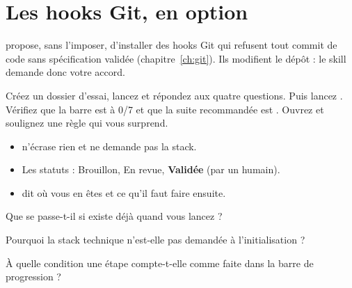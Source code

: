 \section{Les hooks Git, en option}
 propose, sans l'imposer, d'installer des hooks Git qui refusent tout commit de code
sans spécification validée (chapitre~\ref{ch:git}). Ils modifient le dépôt : le skill demande donc votre accord.

\begin{vousjouez}
Créez un dossier d'essai, lancez  et répondez aux quatre questions. Puis lancez
. Vérifiez que la barre est à 0/7 et que la suite recommandée est
. Ouvrez  et soulignez une règle qui vous surprend.
\end{vousjouez}

\begin{retenir}[À retenir]
\begin{itemize}
  \item {} n'écrase rien et ne demande pas la stack.
  \item Les statuts : Brouillon, En revue, \textbf{Validée} (par un humain).
  \item {} dit où vous en êtes et ce qu'il faut faire ensuite.
\end{itemize}
\end{retenir}

\begin{acquis}
  \item Que se passe-t-il si  existe déjà quand vous lancez  ?
  \item Pourquoi la stack technique n'est-elle pas demandée à l'initialisation ?
  \item À quelle condition une étape compte-t-elle comme faite dans la barre de progression ?
\end{acquis}
